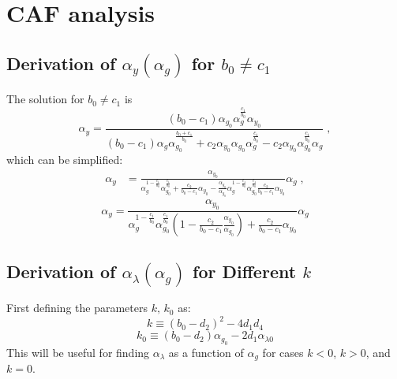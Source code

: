 \section{CAF analysis}
\subsection{Derivation of $\alpha_y(\alpha_g)$ for $b_0\neq c_1$}
The solution for $b_0\neq c_1$ is
\begin{equation*}
    \alpha_y=\frac{(b_0-c_1)\alpha_{g_0}\alpha_g^{\frac{c_1}{b_0}}\alpha_{y_0}}{ (b_0-c_1)\alpha_g\alpha_{g_0}^{\frac{b_0+c_1}{b_0}}+{c_2}\alpha_{y_0}{\alpha_{g_0}}\alpha_g^{\frac{c_1}{b_0}}-c_2\alpha_{y_0}\alpha_{g_0}^{\frac{c_1}{b_0}}\alpha_{g}}\;,
\end{equation*}
which can be simplified:
\begin{align*}
    \alpha_y&=\frac{\alpha_{y_0}}{ \alpha_g^{1-\frac{c_1}{b_0}}\alpha_{g_0}^{\frac{c_1}{b_0}}+\frac{c_2}{b_0-c_1}\alpha_{y_0}-\frac{\alpha_{y_0}}{\alpha_{g_0}}\alpha_g^{1-\frac{c_1}{b_0}}\alpha_{g_0}^{\frac{c_1}{b_0}}\frac{c_2}{b_0-c_1}\alpha_{y_0} }\alpha_g\;,
\end{align*}
\begin{equation}
        \boxed{\alpha_y=\frac{\alpha_{y_0}}{\alpha_g^{1-\frac{c_1}{b_0}}\alpha_{g_0}^{\frac{c_1}{b_0}}\left(1-\frac{c_2}{b_0-c_1}\frac{\alpha_{y_0}}{\alpha_{g_0}}\right)+\frac{c_2}{b_0-c_1}\alpha_{y_0}}
        \alpha_g}\label{eq:alphay}
\end{equation}
\subsection{Derivation of $\alpha_\lambda(\alpha_g)$ for Different $k$}
First defining the parameters $k,\,k_0$ as:
\[
 k \equiv (b_0 - d_2)^2 - 4d_1 d_4
\]
\[
k_0 \equiv (b_0 - d_2)\alpha_{g_0} - 2d_1\alpha_{\lambda0}
\]
This will be useful for finding $\alpha_\lambda$ as a function of $\alpha_g$ for cases $k<0$, $k>0$, and $k=0$.
